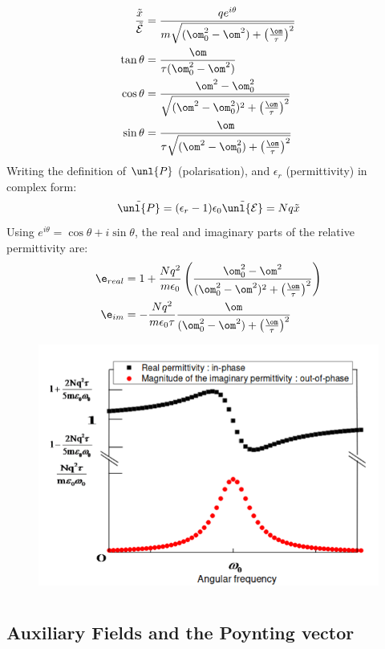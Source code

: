 \documentclass[a4paper, 11pt, normalem]{report}
\renewcommand\E{\mathcal{E}}
\newcommand\uE{\unl{\E}}
\newcommand\eno{\epsilon_0}
\newcommand\er{\epsilon_r}
\newcommand\tx{\tilde{x}}
\begin{document}
\begin{align}
	\frac{\tx}{\tilde{\E}} &= \frac{qe^{i\theta}}{m\sqrt{(\om_0^2 - \om^2) + \left(\frac{\om}{\tau}\right)^2}} \\
	\tan\theta &= \frac{\om}{\tau(\om_0^2 - \om^2)} \\
	\cos\theta &= \frac{\om^2 - \om_0^2}{\sqrt{(\om^2 - \om_0^2)^2 + \left(\frac{\om}{\tau}\right)^2}} \\
	\sin\theta &= \frac{\om}{\tau\sqrt{(\om^2 - \om_0^2) + \left(\frac{\om}{\tau}\right)^2}}
\end{align}
Writing the definition of $\unl{P}$ (polarisation), and $\er$ (permittivity) in complex form:
\begin{equation}
	\tilde{\unl{P}} = (\er - 1)\eno\tilde{\uE} = Nq\tx
\end{equation}
Using $e^{i\theta} = \cos\theta + i\sin\theta$, the real and imaginary parts of the relative permittivity are:
\begin{align}
	\e_{real} &= 1 + \frac{Nq^2}{m\eno}\left(\frac{\om_0^2 - \om^2}{(\om_0^2 - \om^2)^2 + \left(\frac{\om}{\tau}\right)^2}\right) \\
	\e_{im} &= -\frac{Nq^2}{m\eno\tau}\frac{\om}{(\om_0^2 - \om^2) + \left(\frac{\om}{\tau}\right)^2}
\end{align}
\begin{figure}[H]
	\centering
	\includegraphics[scale=0.4]{angfreq.png}
\end{figure}

\chapter{}
\section{Auxiliary Fields and the Poynting vector}
\end{document}
